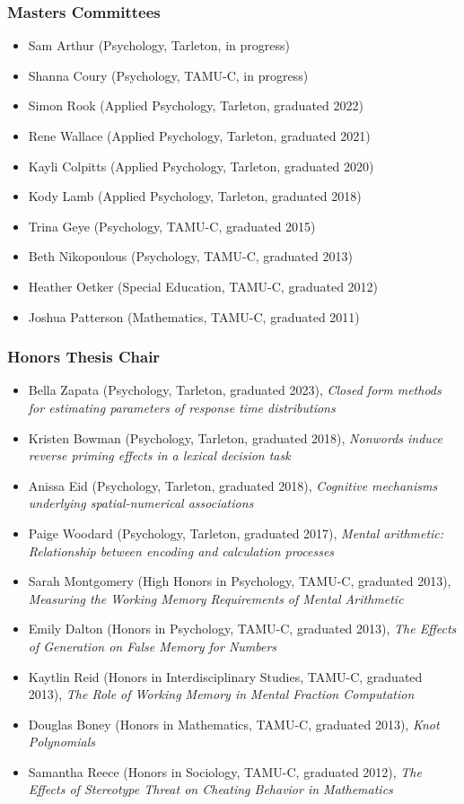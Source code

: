 \documentclass[article,10pt]{article}
\begin{document}
\subsubsection*{Masters Committees}
\label{sec:orgb3f84c3}
\begin{itemize}
\item Sam Arthur (Psychology, Tarleton, in progress)
\item Shanna Coury (Psychology, TAMU-C, in progress)
\item Simon Rook (Applied Psychology, Tarleton, graduated 2022)
\item Rene Wallace (Applied Psychology, Tarleton, graduated 2021)
\item Kayli Colpitts (Applied Psychology, Tarleton, graduated 2020)
\item Kody Lamb (Applied Psychology, Tarleton, graduated 2018)
\item Trina Geye (Psychology, TAMU-C, graduated 2015)
\item Beth Nikopoulous (Psychology, TAMU-C, graduated 2013)
\item Heather Oetker (Special Education, TAMU-C, graduated 2012)
\item Joshua Patterson (Mathematics, TAMU-C, graduated 2011)
\end{itemize}

\subsubsection*{Honors Thesis Chair}
\label{sec:org4398904}
\begin{itemize}
\item Bella Zapata (Psychology, Tarleton, graduated 2023), \emph{Closed form methods for estimating parameters of response time distributions}
\item Kristen Bowman (Psychology, Tarleton, graduated 2018), \emph{Nonwords induce reverse priming effects in a lexical decision task}
\item Anissa Eid (Psychology, Tarleton, graduated 2018), \emph{Cognitive mechanisms underlying spatial-numerical associations}
\item Paige Woodard (Psychology, Tarleton, graduated 2017), \emph{Mental arithmetic: Relationship between encoding and calculation processes}
\item Sarah Montgomery (High Honors in Psychology, TAMU-C, graduated 2013), \emph{Measuring the Working Memory Requirements of Mental Arithmetic}
\item Emily Dalton (Honors in Psychology, TAMU-C, graduated 2013), \emph{The Effects of Generation on False Memory for Numbers}
\item Kaytlin Reid (Honors in Interdisciplinary Studies, TAMU-C, graduated 2013), \emph{The Role of Working Memory in Mental Fraction Computation}
\item Douglas Boney (Honors in Mathematics, TAMU-C, graduated 2013), \emph{Knot Polynomials}
\item Samantha Reece (Honors in Sociology, TAMU-C, graduated 2012), \emph{The Effects of Stereotype Threat on Cheating Behavior in Mathematics}
\end{itemize}
\end{document}

